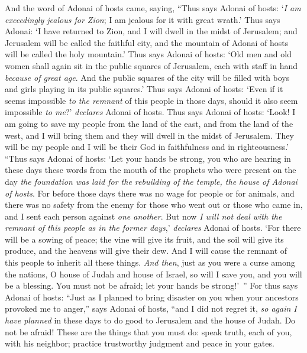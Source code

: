\begin{biblechapter} %
 And the word of Adonai of hosts came, saying,
\verse “Thus says Adonai of hosts: ‘\textit{I am exceedingly jealous for Zion}; I am jealous for it with great wrath.’
\verse Thus says Adonai: ‘I have returned to Zion, and I will dwell in the midst of Jerusalem; and Jerusalem will be called the faithful city, and the mountain of Adonai of hosts will be called the holy mountain.’
\verse Thus says Adonai of hosts: ‘Old men and old women shall again sit in the public squares of Jerusalem, each with staff in hand \textit{because of great age}.
\verse And the public squares of the city will be filled with boys and girls playing in its public squares.’
\verse Thus says Adonai of hosts: ‘Even if it seems impossible \textit{to the remnant} of this people in those days, should it also seem impossible \textit{to me}?’ \textit{declares} Adonai of hosts.
\verse Thus says Adonai of hosts: ‘Look! I am going to save my people from the land of the east, and from the land of the west,
\verse and I will bring them and they will dwell in the midst of Jerusalem. They will be my people and I will be their God in faithfulness and in righteousness.’
\verse “Thus says Adonai of hosts: ‘Let your hands be strong, you who are hearing in these days these words from the mouth of the prophets who were present on the day \textit{the foundation was laid for the rebuilding of the temple, the house of Adonai of hosts}.
\verse For before those days there was no wage for people or for animals, and there was no safety from the enemy for those who went out or those who came in, and I sent each person against \textit{one another}.
\verse But now \textit{I will not deal with the remnant of this people as in the former days},’ \textit{declares} Adonai of hosts.
\verse ‘For there will be a sowing of peace; the vine will give its fruit, and the soil will give its produce, and the heavens will give their dew. And I will cause the remnant of this people to inherit all these things.
\verse \textit{And then}, just as you were a curse among the nations, O house of Judah and house of Israel, so will I save you, and you will be a blessing. You must not be afraid; let your hands be strong!’ ”
\verse For thus says Adonai of hosts: “Just as I planned to bring disaster on you when your ancestors provoked me to anger,” says Adonai of hosts, “and I did not regret it,
\verse \textit{so again I have planned} in these days to do good to Jerusalem and the house of Judah. Do not be afraid!
\verse These are the things that you must do: speak truth, each of you, with his neighbor; practice trustworthy judgment and peace in your gates.

\end{biblechapter}
